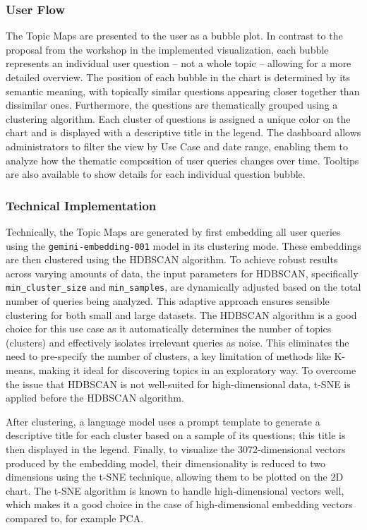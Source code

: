 \documentclass[
	english,
	ruledheaders=section,%
	class=report,%
	thesis={type=bachelor},%
	accentcolor=1b,%
	custommargins=true,%
	marginpar=false,%
	parskip=half-,%
	fontsize=11pt,%
	DIV=14,
]{tudapub}
\begin{document}
\subsubsection{User Flow}
The Topic Maps are presented to the user as a bubble plot. In contrast to the proposal from the workshop in the implemented visualization, each bubble represents an individual user question -- not a whole topic -- allowing for a more detailed overview. The position of each bubble in the chart is determined by its semantic meaning, with topically similar questions appearing closer together than dissimilar ones. Furthermore, the questions are thematically grouped using a clustering algorithm. Each cluster of questions is assigned a unique color on the chart and is displayed with a descriptive title in the legend. The dashboard allows administrators to filter the view by Use Case and date range, enabling them to analyze how the thematic composition of user queries changes over time. Tooltips are also available to show details for each individual question bubble.

\subsubsection{Technical Implementation}
Technically, the Topic Maps are generated by first embedding all user queries using the \texttt{gemini-embedding-001} model in its clustering mode. These embeddings are then clustered using the HDBSCAN algorithm. To achieve robust results across varying amounts of data, the input parameters for HDBSCAN, specifically \texttt{min\_cluster\_size} and \texttt{min\_samples}, are dynamically adjusted based on the total number of queries being analyzed. This adaptive approach ensures sensible clustering for both small and large datasets. The HDBSCAN algorithm is a good choice for this use case as it automatically determines the number of topics (clusters) and effectively isolates irrelevant queries as noise. This eliminates the need to pre-specify the number of clusters, a key limitation of methods like K-means, making it ideal for discovering topics in an exploratory way. To overcome the issue that HDBSCAN is not well-suited for high-dimensional data, t-SNE is applied before the HDBSCAN algorithm.

After clustering, a language model uses a prompt template to generate a descriptive title for each cluster based on a sample of its questions; this title is then displayed in the legend. Finally, to visualize the 3072-dimensional vectors produced by the embedding model, their dimensionality is reduced to two dimensions using the t-SNE technique, allowing them to be plotted on the 2D chart. The t-SNE algorithm is known to handle high-dimensional vectors well, which makes it a good choice in the case of high-dimensional embedding vectors compared to, for example PCA.
\end{document}
